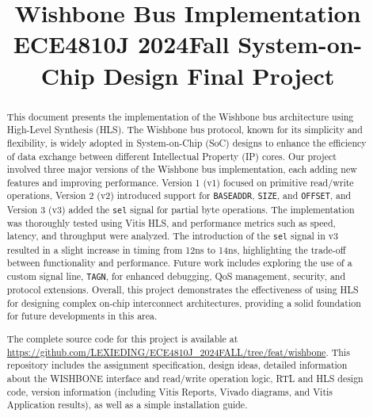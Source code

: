 \documentclass[conference]{IEEEtran}
\begin{document}
\title{Wishbone Bus Implementation\\
{\footnotesize \textsuperscript{}ECE4810J 2024Fall System-on-Chip Design Final Project}
}

\author{
\and
{}
\and
{}

}

\maketitle

\begin{abstract}
This document presents the implementation of the Wishbone bus architecture using High-Level Synthesis (HLS). The Wishbone bus protocol, known for its simplicity and flexibility, is widely adopted in System-on-Chip (SoC) designs to enhance the efficiency of data exchange between different Intellectual Property (IP) cores. Our project involved three major versions of the Wishbone bus implementation, each adding new features and improving performance. Version 1 (v1) focused on primitive read/write operations, Version 2 (v2) introduced support for \texttt{BASEADDR}, \texttt{SIZE}, and \texttt{OFFSET}, and Version 3 (v3) added the \texttt{sel} signal for partial byte operations. The implementation was thoroughly tested using Vitis HLS, and performance metrics such as speed, latency, and throughput were analyzed. The introduction of the \texttt{sel} signal in v3 resulted in a slight increase in timing from 12ns to 14ns, highlighting the trade-off between functionality and performance. Future work includes exploring the use of a custom signal line, \texttt{TAGN}, for enhanced debugging, QoS management, security, and protocol extensions. Overall, this project demonstrates the effectiveness of using HLS for designing complex on-chip interconnect architectures, providing a solid foundation for future developments in this area.

The complete source code for this project is available at \url{https://github.com/LEXIEDING/ECE4810J_2024FALL/tree/feat/wishbone}. This repository includes the assignment specification, design ideas, detailed information about the WISHBONE interface and read/write operation logic, RTL and HLS design code, version information (including Vitis Reports, Vivado diagrams, and Vitis Application results), as well as a simple installation guide.

\end{abstract}
\end{document}
